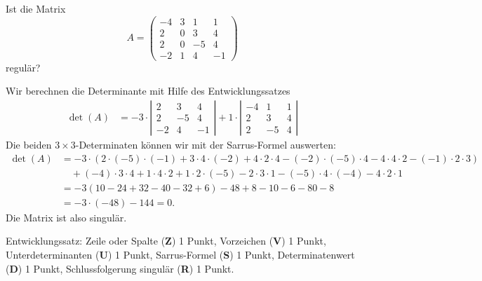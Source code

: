 Ist die Matrix
\[
A=
\begin{pmatrix}
  -4 & 3 & 1 & 1\\
   2 & 0 & 3 & 4\\
   2 & 0 &-5 & 4\\
  -2 & 1 & 4 &-1
\end{pmatrix}
\]
regulär?

\begin{loesung}
Wir berechnen die Determinante mit Hilfe des Entwicklungssatzes
\begin{align*}
\det(A)
&=
-
3\cdot\left|
\begin{matrix}
 2& 3& 4\\
 2&-5& 4\\
-2& 4&-1
\end{matrix}
\right|
+
1\cdot\left|
\begin{matrix}
-4& 1& 1\\
 2& 3& 4\\
 2&-5& 4
\end{matrix}
\right|
\end{align*}
Die beiden $3\times 3$-Determinaten können wir mit der Sarrus-Formel
auswerten:
\begin{align*}
\det(A)
&=
-3\cdot(
2\cdot(-5)\cdot(-1) + 3\cdot 4\cdot(-2)+4\cdot 2\cdot 4
-(-2)\cdot(-5)\cdot 4-4\cdot 4\cdot 2 - (-1)\cdot 2\cdot 3
)
\\
&\quad+
(-4)\cdot 3\cdot 4+1\cdot 4\cdot 2+1\cdot 2\cdot(-5)
-2\cdot 3\cdot 1-(-5)\cdot 4\cdot(-4) -4\cdot 2\cdot 1
\\
&=-3(10-24+32-40-32+6)-48+8-10-6-80-8
\\
&=-3\cdot (-48)-144=0.
\end{align*}
Die Matrix ist also singulär.
\end{loesung}

\begin{bewertung}
Entwicklungssatz: Zeile oder Spalte ({\bf Z}) 1 Punkt,
Vorzeichen ({\bf V}) 1 Punkt,
Unterdeterminanten ({\bf U}) 1 Punkt,
Sarrus-Formel ({\bf S}) 1 Punkt,
Determinatenwert ({\bf D}) 1 Punkt,
Schlussfolgerung singulär ({\bf R}) 1 Punkt.
\end{bewertung}

